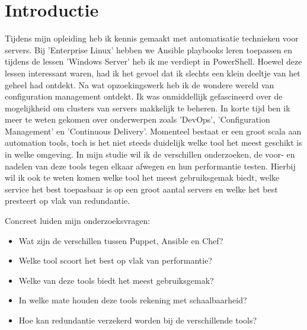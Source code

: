 \documentclass[fleqn,10pt]{voorstel}
\affiliation{\textbf{Contact:}
  \href{mailto:jens.uyttersprot.v4158@student.hogent.be}{jens.uyttersprot.v4158@student.hogent.be};}
\begin{document}
\flushbottom %
\maketitle %
\tableofcontents %
\thispagestyle{empty} %



\section{Introductie} %
\label{sec:introductie}

Tijdens mijn opleiding heb ik kennis gemaakt met automatisatie technieken voor servers. Bij 'Enterprise Linux' hebben we Ansible playbooks leren toepassen en tijdens de lessen 'Windows Server' heb ik me verdiept in PowerShell. Hoewel deze lessen interessant waren, had ik het gevoel dat ik slechts een klein deeltje van het geheel had ontdekt. Na wat opzoekingswerk heb ik de wondere wereld van configuration management ontdekt. Ik was onmiddellijk gefascineerd over de mogelijkheid om clusters van servers makkelijk te beheren. In korte tijd ben ik meer te weten gekomen over onderwerpen zoals 'DevOps', 'Configuration Management' en 'Continuous Delivery'. Momenteel bestaat er een groot scala aan automation tools, toch is het niet steeds duidelijk welke tool het meest geschikt is in welke omgeving. In mijn studie wil ik de verschillen onderzoeken, de voor- en nadelen van deze tools tegen elkaar afwegen en hun performantie testen. Hierbij wil ik ook te weten komen welke tool het meest gebruiksgemak biedt, welke service het best toepasbaar is op een groot aantal servers en welke het best presteert op vlak van redundantie.

Concreet luiden mijn onderzoeksvragen:
\begin{itemize}
\item Wat zijn de verschillen tussen Puppet, Ansible en Chef?
\item Welke tool scoort het best op vlak van performantie?
\item Welke van deze tools biedt het meest gebruiksgemak?
\item In welke mate houden deze tools rekening met schaalbaarheid?
\item Hoe kan redundantie verzekerd worden bij de verschillende tools?
\end{itemize}
\end{document}
